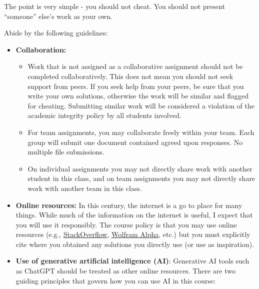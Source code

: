 \documentclass[
  letterpaper,
  DIV=11,
  numbers=noendperiod]{scrartcl}
\providecommand{\tightlist}{%
  \setlength{\itemsep}{0pt}\setlength{\parskip}{0pt}}\usepackage{longtable,booktabs,array}
\begin{document}
The point is very simple - {you should not cheat.} You should not
present ``someone'' else's work as your own.

Abide by the following guidelines:

\begin{itemize}
\item
  \textbf{Collaboration:}

  \begin{itemize}
  \tightlist
  \item
    Work that is not assigned as a collaborative assignment should not
    be completed collaboratively. This does not mean you should not seek
    support from peers. If you seek help from your peers, be sure that
    you write your own solutions, otherwise the work will be similar and
    flagged for cheating. Submitting similar work will be considered a
    violation of the academic integrity policy by all students involved.
  \item
    For team assignments, you may collaborate freely within your team.
    Each group will submit one document contained agreed upon responses.
    No multiple file submissions.\\
  \item
    On individual assignments you may not directly share work with
    another student in this class, and on team assignments you may not
    directly share work with another team in this class.
  \end{itemize}
\item
  \textbf{Online resources:} In this century, the internet is a go to
  place for many things. While much of the information on the internet
  is useful, I expect that you will use it responsibly. The course
  policy is that you may use online resources (e.g.,
  \href{https://stackoverflow.com/}{StackOverflow},
  \href{https://www.wolframalpha.com/}{Wolfram Alpha}, etc.) but you
  must explicitly cite where you obtained any solutions you directly use
  (or use as inspiration).
\item
  \textbf{Use of generative artificial intelligence (AI)}: Generative AI
  tools such as ChatGPT should be treated as other online resources.
  There are two guiding principles that govern how you can use AI in
  this course:


\end{itemize}
\end{document}
